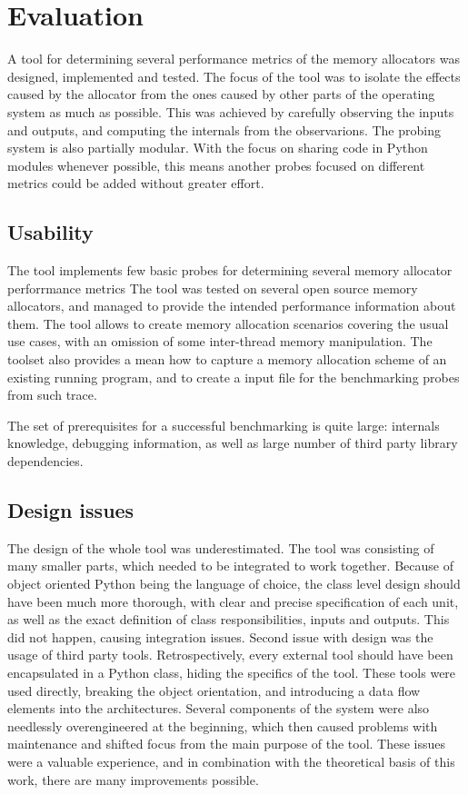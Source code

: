 \section{Evaluation}

A tool for determining several performance metrics of the memory allocators was designed, implemented and tested. The focus of the tool was to isolate the effects caused by the allocator from the ones caused by other parts of the operating system as much as possible. This was achieved by carefully observing the inputs and outputs, and computing the internals from the observarions. The probing system is also partially modular. With the focus on sharing code in Python modules whenever possible, this means another probes focused on different metrics could be added without greater effort.

\subsection{Usability}

The tool implements few basic probes for determining several memory allocator perforrmance metrics The tool was tested on several open source memory allocators, and managed to provide the intended performance information about them. The tool allows to create memory allocation scenarios covering the usual use cases, with an omission of some inter-thread memory manipulation. The toolset also provides a mean how to capture a memory allocation scheme of an existing running program, and to create a input file for the benchmarking probes from such trace.

The set of prerequisites for a successful benchmarking is quite large: internals knowledge, debugging information, as well as large number of third party library dependencies.

\subsection{Design issues}
The design of the whole tool was underestimated. The tool was consisting of many smaller parts, which needed to be integrated to work together. Because of object oriented Python being the language of choice, the class level design should have been much more thorough, with clear and precise specification of each unit, as well as the exact definition of class responsibilities, inputs and outputs. This did not happen, causing integration issues. Second issue with design was the usage of third party tools. Retrospectively, every external tool should have been encapsulated in a Python class, hiding the specifics of the tool. These tools were used directly, breaking the object orientation, and introducing a data flow elements into the architectures. Several components of the system were also needlessly overengineered at the beginning, which then caused problems with maintenance and shifted focus from the main purpose of the tool. These issues were a valuable experience, and in combination with the theoretical basis of this work, there are many improvements possible.


